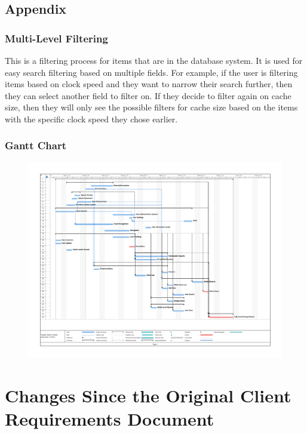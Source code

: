 \documentclass[10pt, onecolumn, twoside, peerreview]{IEEEtran}
\begin{document}
\subsection{Appendix}
\subsubsection{Multi-Level Filtering}
This is a filtering process for items that are in the database system. It is used for easy search filtering based on
multiple fields. For example, if the user is filtering items based on clock speed and they want to narrow their search
further, then they can select another field to filter on. If they decide to filter again on cache size, then they will
only see the possible filters for cache size based on the items with the specific clock speed they chose earlier.\\

\subsubsection{Gantt Chart}
\begin{figure}[H]
	\includegraphics[angle=90, width=\textwidth]{gantt}
\end{figure}
\clearpage

\section{Changes Since the Original Client Requirements Document}
\end{document}
